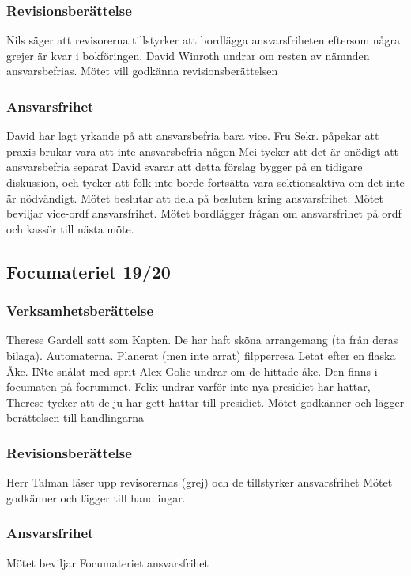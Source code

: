 \documentclass{sektionsmote}
\begin{document}
\subsubsection{Revisionsberättelse}
Nils säger att revisorerna tillstyrker att bordlägga ansvarsfriheten eftersom några grejer är kvar i bokföringen.
David Winroth undrar om resten av nämnden ansvarsbefrias.
Mötet vill godkänna revisionsberättelsen

\subsubsection{Ansvarsfrihet}
David har lagt yrkande på att ansvarsbefria bara vice.
Fru Sekr. påpekar att praxis brukar vara att inte ansvarsbefria någon
Mei tycker att det är onödigt att ansvarsbefria separat
David svarar att detta förslag bygger på en tidigare diskussion, och tycker att folk inte borde fortsätta vara sektionsaktiva om det inte är nödvändigt.
Mötet beslutar att dela på besluten kring ansvarsfrihet.
Mötet beviljar vice-ordf ansvarsfrihet.
Mötet bordlägger frågan om ansvarsfrihet på ordf och kassör till nästa möte.

\subsection{Focumateriet 19/20}

\subsubsection{Verksamhetsberättelse}
Therese Gardell satt som Kapten.
De har haft sköna arrangemang (ta från deras bilaga).
Automaterna.
Planerat (men inte arrat) filpperresa
Letat efter en flaska Åke.
INte snålat med sprit
Alex Golic undrar om de hittade åke. Den finns i focumaten på focrummet.
Felix undrar varför inte nya presidiet har hattar, Therese tycker att de ju har gett hattar till presidiet.
Mötet godkänner och lägger berättelsen till handlingarna

\subsubsection{Revisionsberättelse}
Herr Talman läser upp revisorernas (grej) och de tillstyrker ansvarsfrihet
Mötet godkänner och lägger till handlingar.

\subsubsection{Ansvarsfrihet}
Mötet beviljar Focumateriet ansvarsfrihet
\end{document}
